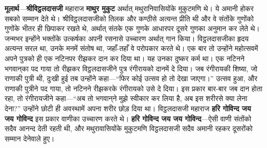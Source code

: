 \begin{sloppypar}\justifying{}
\textbf{मूलार्थ}—\textbf{श्रीविट्ठल\-दासजी} महाराज \textbf{माथुर मुकुट} अर्थात् मथुरानिवासियोंके मुकुटमणि थे। ये अमानी होकर सबको सम्मान देते थे। श्रीविट्ठल\-दासजीको तिलक और कण्ठीसे अत्यन्त प्रीति थी और वे संतोंके गुणोंको गुणोंके भीतर ही छिपाकर रखते थे, अर्थात् संतके एक गुणके आधारपर दूसरे गुणका अनुमान कर लेते थे। जन्मभर इन्होंने भक्तोंके उत्कर्षका अपनी रसनासे उच्चारण अर्थात् गान किया। विट्ठल\-दासजीका हृदय अत्यन्त सरल था, उनके मनमें संतोष था, जहाँ-तहाँ वे परोपकार करते थे। एक बार तो उन्होंने महोत्सवमें अपने पुत्रको ही एक नटिनपर रीझकर दान कर दिया था। यह उनका दुष्कर कर्म था। एक नटिनने भगवान्‌‌का पद गाया तो रीझकर विट्ठलदासजीने पुत्र रंगीरायको दानमें दे दिया। जब रंगीरायकी शिष्या, जो राणाकी पुत्री थी, दुःखी हुई तब उन्होंने कहा—“फिर कोई उत्सव हो तो देखा जाएगा।” उत्सव हुआ, और राणाकी पुत्रीने पद गाया, तो नटिनने रीझकरके रंगीरायको उसे दे दिया। इस प्रकार बार-बार जब दान होता रहा, तो रंगीरायजीने कहा—“अब तो भगवान्‌ने मुझे स्वीकार कर लिया है, अब इस शरीरसे क्या लेना देना?” उन्होंने छोटी ही अवस्थामें अपना शरीर छोड़ दिया था। विट्ठल\-दासजी महाराज \textbf{हरि गोविन्द जय जय गोविन्द} इस प्रकार वाणीका उच्चारण करते थे। \textbf{हरि गोविन्द जय जय गोविन्द}—ऐसी वाणी संतोंको सदैव आनन्द देती रहती थी, और मथुरावासियोंके मुकुटमणि विट्ठल\-दासजी सदैव अमानी रहकर दूसरोंको सम्मान देनेवाले हुए।
\end{sloppypar}


